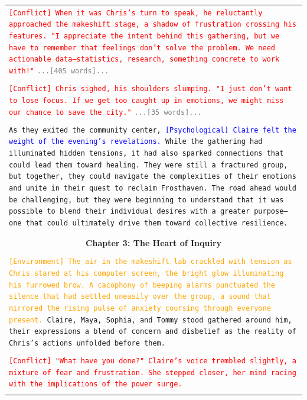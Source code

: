 \documentclass[letterpaper]{article} %
\begin{document}
\begin{small}
\begin{longtable}{p{\textwidth}}
    \texttt{\textcolor{red}{[Conflict] When it was Chris's turn to speak, he reluctantly approached the makeshift stage, a shadow of frustration crossing his features. "I appreciate the intent behind this gathering, but we have to remember that feelings don't solve the problem. We need actionable data—statistics, research, something concrete to work with!"}}
    \texttt{\textcolor{gray}{...[405 words]...}} \\\\

    \texttt{\textcolor{red}{[Conflict] Chris sighed, his shoulders slumping. "I just don't want to lose focus. If we get too caught up in emotions, we might miss our chance to save the city."}}
    \texttt{\textcolor{gray}{...[35 words]...}} \\\\

    \texttt{As they exited the community center, \textcolor{blue}{[Psychological] Claire felt the weight of the evening's revelations.} While the gathering had illuminated hidden tensions, it had also sparked connections that could lead them toward healing. They were still a fractured group, but together, they could navigate the complexities of their emotions and unite in their quest to reclaim Frosthaven. The road ahead would be challenging, but they were beginning to understand that it was possible to blend their individual desires with a greater purpose—one that could ultimately drive them toward collective resilience.} \\\\

    \midrule \\
    \multicolumn{1}{c}{\normalsize \textbf{Chapter 3: The Heart of Inquiry}} \\\\
    
    \texttt{\textcolor{orange}{[Environment] The air in the makeshift lab crackled with tension as Chris stared at his computer screen, the bright glow illuminating his furrowed brow. A cacophony of beeping alarms punctuated the silence that had settled uneasily over the group, a sound that mirrored the rising pulse of anxiety coursing through everyone present.} Claire, Maya, Sophia, and Tommy stood gathered around him, their expressions a blend of concern and disbelief as the reality of Chris's actions unfolded before them.} \\\\

    \texttt{\textcolor{red}{[Conflict] "What have you done?" Claire's voice trembled slightly, a mixture of fear and frustration. She stepped closer, her mind racing with the implications of the power surge.}} \\\\


\end{longtable}
\end{small}
\end{document}
